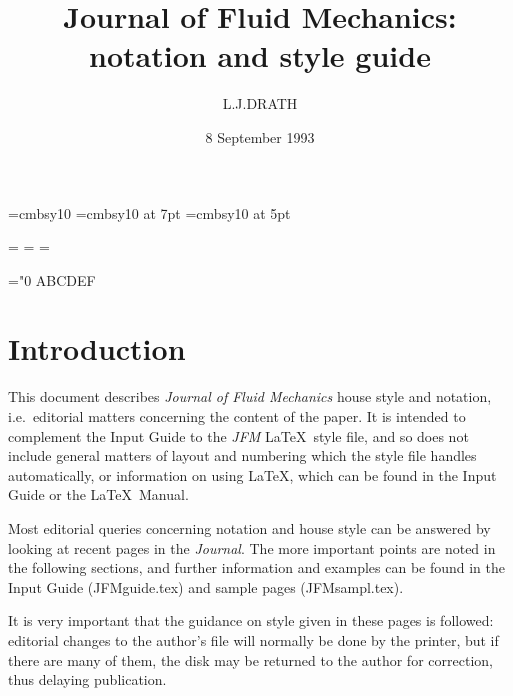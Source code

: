 



\def\hexnumber#1{\ifcase#1 0\or1\or2\or3\or4\or5\or6\or7\or8\or9\or
  A\or B\or C\or D\or E\or F\fi }

\font\tenbms=cmbsy10
\font\sevenbms=cmbsy10 at 7pt
\font\fivebms=cmbsy10 at 5pt

\newfam\bmsfam
\textfont\bmsfam=\tenbms
\scriptfont\bmsfam=\sevenbms
\scriptscriptfont\bmsfam=\fivebms
\def\bms{\fam\bmsfam\tenbms}
\edef\bsy@{\hexnumber\bmsfam}

\mathchardef\bnabla="0\bsy@72 %

\newcommand{\etal}{{\it et al\/}.\ }

\title[Notation and style guide]{Journal of Fluid Mechanics:\\%
       notation and style guide}
\author[L. J. Drath]{L.\ns J.\ns D\ls R\ls A\ls T\ls H}
\date{8 September 1993}


\maketitle
\section{Introduction}
This document describes {\it Journal of Fluid Mechanics}
house style and notation, i.e.\ editorial matters concerning the content of the
paper. It is intended to complement the Input Guide to the
{\it JFM\/} \LaTeX\ style file, and so does not include general matters of
layout and numbering which the style file handles automatically, or  
information on using \LaTeX, which can be found in the Input Guide or the \LaTeX\ Manual.

Most editorial queries concerning notation and house style can be answered by
looking at recent pages in the {\it Journal}. The more important points are
noted in the following sections, and further information and examples
can be found in the Input Guide (JFMguide.tex) and sample pages (JFMsampl.tex).

It is very important that the guidance on style given in these pages
is followed:
editorial changes to the author's file will normally be done by the
printer, but if there are many of them, the disk may be returned to
the author for correction, thus delaying publication.

